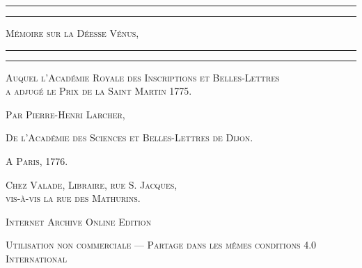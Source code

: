 \documentclass[a4paper, 18pt, oneside]{article}
\begin{document}
\color{white}
\begin{titlepage} %
	\centering %

	
	\rule{\textwidth}{1.6pt}\vspace*{-\baselineskip}\vspace*{2pt} %
	\rule{\textwidth}{0.4pt} %
	
	\vspace{1\baselineskip} %
	
	{\scshape\Huge Mémoire sur la Déesse Vénus,}
	
	\vspace{1\baselineskip} %

	\rule{\textwidth}{0.4pt}\vspace*{-\baselineskip}\vspace{3.2pt} %
	\rule{\textwidth}{1.6pt} %
	
	\vspace{1\baselineskip} %
	

 {\scshape Auquel l'Académie Royale des Inscriptions et Belles-Lettres\\ a adjugé le Prix de la Saint Martin 1775.} %

 	\vspace*{1\baselineskip} %

	{\scshape \Large Par Pierre-Henri Larcher,} %

 	\vspace*{1\baselineskip} %

{\scshape De l'Académie des Sciences et Belles-Lettres de Dijon.} %

\vspace*{\fill}

	\vspace{1\baselineskip}

	{\small\scshape A Paris, 1776.}
	
	{\small\scshape{Chez Valade, Libraire, rue S. Jacques,\\ vis-à-vis la rue des Mathurins.}}
	
	\vspace{0.5\baselineskip} %

\scshape Internet Archive Online Edition%
	
	{\scshape\small Utilisation non commerciale --- Partage dans les mêmes conditions 4.0 International} %
\end{titlepage}
\end{document}
